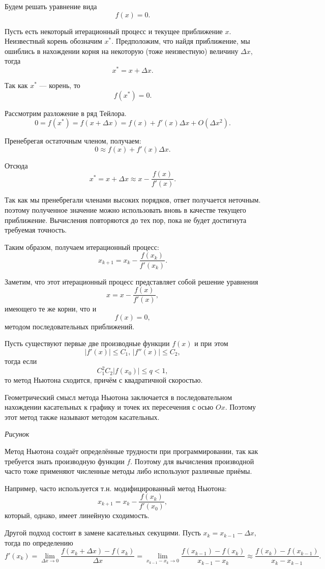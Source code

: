 Будем решать уравнение вида 
\[
f(x)=0.
\]


Пусть есть некоторый итерационный процесс и текущее приближение $x$.
Неизвестный корень обозначим $x^{*}$. Предположим, что найдя
приближение, мы ошиблись в нахождении корня на некоторую (тоже
неизвестную) величину $\Delta x$, тогда
\[
x^{*}=x+\Delta x.
\]


Так как $x^{*}$ — корень, то
\[
f(x^{*})=0.
\]


Рассмотрим разложение в ряд Тейлора.
\[
0=f(x^{*})=f(x+\Delta x)=f(x)+f'(x)\Delta x+O(\Delta x^{2}).
\]


Пренебрегая остаточным членом, получаем:
\[
0\approx f(x)+f'(x)\Delta x.
\]


Отсюда
\[
x^{*}=x+\Delta x\approx x-\frac{f(x)}{f'(x)}.
\]


Так как мы пренебрегали членами высоких порядков, ответ получается
неточным. поэтому полученное значение можно использовать вновь в качестве
текущего приближение. Вычисления повторяются до тех пор, пока не будет
достигнута требуемая точность.

Таким образом, получаем итерационный процесс:
\[
x_{k+1}=x_{k}-\frac{f(x_{k})}{f'(x_{k})}.
\]


Заметим, что этот итерационный процесс представляет собой решение
уравнения
\[
x=x-\frac{f(x)}{f'(x)},
\]
имеющего те же корни, что и
\[
f(x)=0,
\]
методом последовательных приближений.
\begin{thm}
Пусть существуют первые две производные функции $f(x)$ и при этом
\[
|f'(x)|\leqslant C_{1},\,|f''(x)|\leqslant C_{2},
\]
тогда если
\[
C_{1}^{2}C_{2}|f(x_{0})|\leqslant q<1,
\]
то метод Ньютона сходится, причём с квадратичной скоростью.
\end{thm}
Геометрический смысл метода Ньютона заключается в последовательном
нахождении касательных к графику и точек их пересечения с осью $Ox$.
Поэтому этот метод также называют методом касательных.

\emph{Рисунок}

Метод Ньютона создаёт определённые трудности при программировании,
так как требуется знать производную функции $f$. Поэтому для вычисления
производной часто тоже применяют численные методы либо используют
различные приёмы.

Например, часто используется т.н. модифицированный метод Ньютона:
\[
x_{k+1}=x_{k}-\frac{f(x_{k})}{f'(x_{0})},
\]
который, однако, имеет линейную сходимость.

Другой подход состоит в замене касательных секущими. Пусть
$x_{k}=x_{k-1}-\Delta x,$ тогда по определению
\[
f'(x_{k})=\lim_{\Delta x\rightarrow0}\frac{f(x_{k}+\Delta x)-f(x_{k})}{\Delta x}=\lim_{x_{k-1}-x_{k}\rightarrow0}\frac{f(x_{k-1})-f(x_{k})}{x_{k-1}-x_{k}}\approx\frac{f(x_{k})-f(x_{k-1})}{x_{k}-x_{k-1}}.
\]


